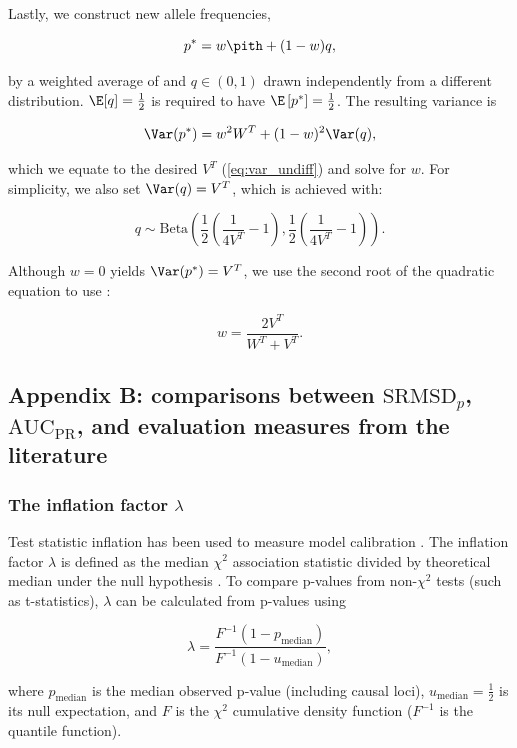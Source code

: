 \documentclass[11pt]{article}
\newcommand{\rmsd}{\text{SRMSD}_p}
\newcommand{\auc}{\text{AUC}_\text{PR}}
\begin{document}
\begin{linenumbers}
Lastly, we construct new allele frequencies,
\begin{linenomath*}
$$
p^* = w \pith + ( 1 - w ) q,
$$
\end{linenomath*}
by a weighted average of \pith and $q \in (0, 1)$ drawn independently from a different distribution.
$\E[q] = \frac{1}{2}$ is required to have $\E \left[ p^* \right] = \frac{1}{2}$.
The resulting variance is
\begin{linenomath*}
$$
\Var(p^*)
=
w^2 W^T + (1-w)^2 \Var(q)
,
$$
\end{linenomath*}
which we equate to the desired $V^T$ (\cref{eq:var_undiff}) and solve for $w$.
For simplicity, we also set $\Var(q) = V^T$, which is achieved with:
\begin{linenomath*}
$$
q \sim \text{Beta} \left( \frac{1}{2} \left( \frac{1}{ 4 V^T } - 1 \right), \frac{1}{2} \left( \frac{1}{ 4 V^T } - 1 \right) \right)
.
$$
\end{linenomath*}
Although $w=0$ yields $\Var(p^*) = V^T$, we use the second root of the quadratic equation to use \pith:
\begin{linenomath*}
$$
w = \frac{ 2 V^T }{ W^T + V^T }.
$$
\end{linenomath*}



\subsection{Appendix B: comparisons between $\rmsd$, $\auc$, and evaluation measures from the literature}

\subsubsection{The inflation factor $\lambda$}

Test statistic inflation has been used to measure model calibration \citep{astle_population_2009, price_new_2010}.
The inflation factor $\lambda$ is defined as the median $\chi^2$ association statistic divided by theoretical median under the null hypothesis \citep{devlin_genomic_1999}.
To compare p-values from non-$\chi^2$ tests (such as t-statistics), $\lambda$ can be calculated from p-values using
\begin{linenomath*}
$$
\lambda
=
\frac{
  F^{-1} \left( 1 - p_\text{median} \right)
}{
  F^{-1} \left( 1 - u_\text{median} \right)
}
,
$$
\end{linenomath*}
where $p_\text{median}$ is the median observed p-value (including causal loci),
$u_\text{median} = \frac{1}{2}$ is its null expectation,
and $F$ is the $\chi^2$ cumulative density function ($F^{-1}$ is the quantile function).


\end{linenumbers}
\end{document}
